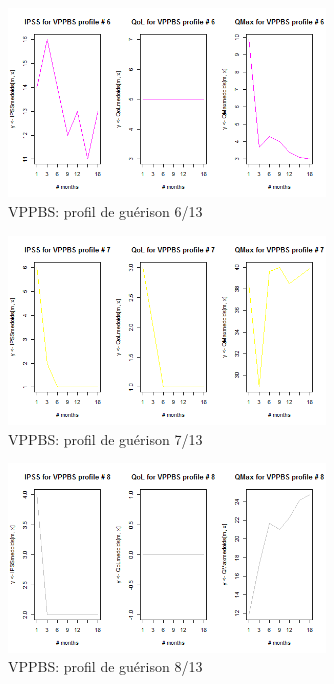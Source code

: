 \begin{figure}[H]
\centering
\includegraphics[width=0.75\textwidth]{../Fig/VPPBS/vppbs-profil-post-06.png}
\caption{VPPBS: profil de guérison 6/13}
\end{figure}

\begin{figure}[H]
\centering
\includegraphics[width=0.75\textwidth]{../Fig/VPPBS/vppbs-profil-post-07.png}
\caption{VPPBS: profil de guérison 7/13}
\end{figure}

\begin{figure}[H]
\centering
\includegraphics[width=0.75\textwidth]{../Fig/VPPBS/vppbs-profil-post-08.png}
\caption{VPPBS: profil de guérison 8/13}
\end{figure}

